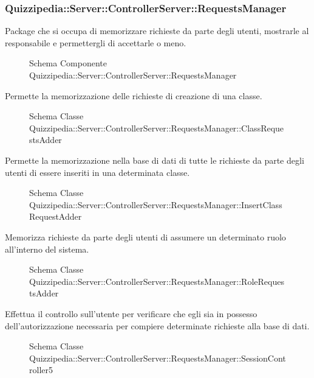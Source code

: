 \subsubsection{Quizzipedia::Server::ControllerServer::RequestsManager}
Package che si occupa di memorizzare richieste da parte degli utenti, mostrarle al responsabile e permettergli di accettarle o meno.
\begin{figure}[H]
\centering
\noindent{}
\caption{Schema Componente Quizzipedia::Server::ControllerServer::RequestsManager}
\end{figure}
Permette la memorizzazione delle richieste di creazione di una classe.
\begin{figure}[H]
\centering
\noindent{}
\caption{Schema Classe Quizzipedia::Server::ControllerServer::RequestsManager::ClassRequestsAdder}
\end{figure}
Permette la memorizzazione nella base di dati di tutte le richieste da parte degli utenti di essere inseriti in una determinata classe.
\begin{figure}[H]
\centering
\noindent{}
\caption{Schema Classe Quizzipedia::Server::ControllerServer::RequestsManager::InsertClassRequestAdder}
\end{figure}
Memorizza richieste da parte degli utenti di assumere un determinato ruolo all'interno del sistema.
\begin{figure}[H]
\centering
\noindent{}
\caption{Schema Classe Quizzipedia::Server::ControllerServer::RequestsManager::RoleRequestsAdder}
\end{figure}
Effettua il controllo sull'utente per verificare che egli sia in possesso dell'autorizzazione necessaria per compiere determinate richieste alla base di dati.
\begin{figure}[H]
\centering
\noindent{}
\caption{Schema Classe Quizzipedia::Server::ControllerServer::RequestsManager::SessionController5}
\end{figure}

